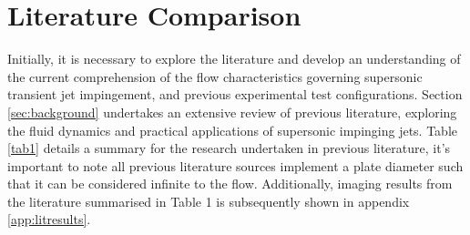 \section{Literature Comparison}
Initially, it is necessary to explore the literature and develop an understanding of the current comprehension of the flow characteristics governing supersonic transient jet impingement, and previous experimental test configurations. Section \ref{sec:background} undertakes an extensive review of previous literature, exploring the fluid dynamics and practical applications of supersonic impinging jets. Table \ref{tab1} details a summary for the research undertaken in previous literature, it's important to note all previous literature sources implement a plate diameter such that it can be considered infinite to the flow. Additionally, imaging results from the literature summarised in Table 1 is subsequently shown in appendix \ref{app:litresults}.

